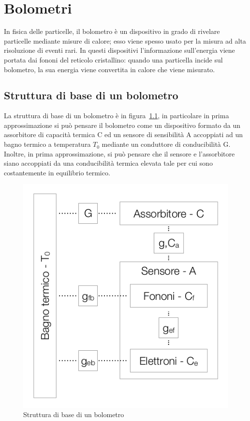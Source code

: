 \chapter{Bolometri}
In fisica delle particelle, il bolometro \`e un dispositivo in grado di rivelare particelle mediante misure di calore;
esso viene spesso usato per la misura ad alta risoluzione di eventi rari.
In questi dispositivi l'informazione sull'energia viene portata dai fononi del reticolo cristallino: quando una particella
incide sul bolometro, la sua energia viene convertita in calore che viene misurato.
\section{Struttura di base di un bolometro}
La struttura di base di un bolometro \`e in figura~\ref{fig:strutturaBolometro}, in particolare in prima approssimazione
si pu\`o pensare il bolometro come un dispositivo formato da un assorbitore di capacit\`a termica C ed un sensore di sensibilit\`a A accoppiati
ad un bagno termico a temperatura $T_0$ mediante un conduttore di conducibilit\`a G.
Inoltre, in prima approssimazione, si pu\`o pensare che il sensore e l'assorbitore siano accoppiati da una conducibilit\`a termica elevata tale
per cui sono costantemente in equilibrio termico.
\begin{figure}[htbp]
\begin{center}
\includegraphics[scale=1]{./Immagini/StrutturaBolometro.png}
\caption{Struttura di base di un bolometro}
\label{fig:strutturaBolometro}
\end{center}
\end{figure}

